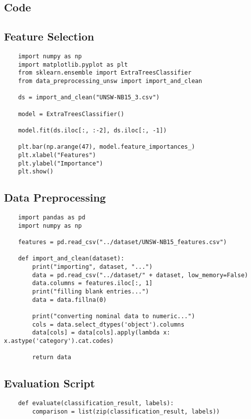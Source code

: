 \begin{appendix}

\chapter{Code}
\section{Feature Selection}
\scriptsize{
\begin{verbatim}
    import numpy as np
    import matplotlib.pyplot as plt
    from sklearn.ensemble import ExtraTreesClassifier
    from data_preprocessing_unsw import import_and_clean

    ds = import_and_clean("UNSW-NB15_3.csv")

    model = ExtraTreesClassifier()

    model.fit(ds.iloc[:, :-2], ds.iloc[:, -1])

    plt.bar(np.arange(47), model.feature_importances_)
    plt.xlabel("Features")
    plt.ylabel("Importance")
    plt.show()
\end{verbatim}


\section{Data Preprocessing}
\begin{verbatim}
    import pandas as pd
    import numpy as np

    features = pd.read_csv("../dataset/UNSW-NB15_features.csv")

    def import_and_clean(dataset):
        print("importing", dataset, "...")
        data = pd.read_csv("../dataset/" + dataset, low_memory=False)
        data.columns = features.iloc[:, 1]
        print("filling blank entries...")
        data = data.fillna(0)

        print("converting nominal data to numeric...")
        cols = data.select_dtypes('object').columns
        data[cols] = data[cols].apply(lambda x: x.astype('category').cat.codes)

        return data
\end{verbatim}

\section{Evaluation Script}
\begin{verbatim}
    def evaluate(classification_result, labels):
        comparison = list(zip(classification_result, labels))


\end{verbatim}}
\end{appendix}
